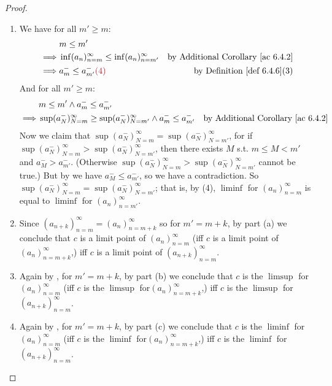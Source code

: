 \begin{proof}
\begin{enumerate}
\item
We have for all \(m' \ge m\):
\begin{align*}
             & m \le m' \\
    \implies & \inf(a_n)_{n = m}^{\infty} \le \inf(a_n)_{n = m'}^{\infty} & \text{by \AC{6.4.2}} \\
    \implies & a_m^- \le a_{m'}^- \MAROON{(4)} & \text{by \DEF{6.4.6}(3)}
\end{align*}
And for all \(m' \ge m\):
\begin{align*}
             & m \le m' \land a_m^- \le a_{m'}^- \\
    \implies & \sup(a_N^-)_{N = m}^{\infty} \ge \sup(a_N^-)_{N = m'}^{\infty} \land a_m^- \le a_{m'}^- & \text{by \AC{6.4.2}}
\end{align*}
Now we claim that \(\sup(a_N^-)_{N = m}^{\infty} = \sup(a_N^-)_{N = m'}^{\infty}\),
for if \(\sup(a_N^-)_{N = m}^{\infty} > \sup(a_N^-)_{N = m'}^{\infty}\), then there exists \(M\) s.t. \(m \le M < m'\) and \(a_M^- > a_{m'}^-\).
(Otherwise \(\sup(a_N^-)_{N = m}^{\infty} > \sup(a_N^-)_{N = m'}^{\infty}\) cannot be true.)
But by  we have \(a_M^- \le a_{m'}^-\), so we have a contradiction.
So \(\sup(a_N^-)_{N = m}^{\infty} = \sup(a_N^-)_{N = m'}^{\infty}\);
that is, by (4), \(\liminf\) for \((a_n)_{n = m}^{\infty}\) is equal to \(\liminf\) for \((a_n)_{n = m'}^{\infty}\).

\item
Since \((a_{n + k})_{n = m}^{\infty} = (a_n)_{n = m + k}^{\infty}\)  so for \(m' = m + k\),
by part (a) we conclude that \(c\) is a limit point of \((a_n)_{n = m}^{\infty}\)
(iff \(c\) is a limit point of \((a_n)_{n = m + k}^{\infty}\),)
iff \(c\) is a limit point of \((a_{n + k})_{n = m}^{\infty}\).

\item
Again by , for \(m' = m + k\),
by part (b) we conclude that \(c\) is the \(\limsup\) for \((a_n)_{n = m}^{\infty}\)
(iff \(c\) is the \(\limsup\) for\((a_n)_{n = m + k}^{\infty}\),)
iff \(c\) is the \(\limsup\) for \((a_{n + k})_{n = m}^{\infty}\).

\item
Again by , for \(m' = m + k\),
by part (c) we conclude that \(c\) is the \(\liminf\) for \((a_n)_{n = m}^{\infty}\)
(iff \(c\) is the \(\liminf\) for\((a_n)_{n = m + k}^{\infty}\),)
iff \(c\) is the \(\liminf\) for \((a_{n + k})_{n = m}^{\infty}\).
\end{enumerate}
\end{proof}

